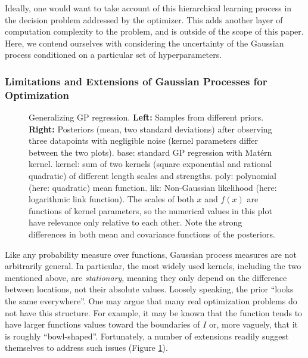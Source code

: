 \documentclass[twoside,11pt]{article}
\newcommand{\inputTikZ}[1]{%
 }
\newcommand{\inputTikZ}[1]{%
   \beginpgfgraphicnamed{#1-external}%
   \endpgfgraphicnamed%
 }
\begin{document}
Ideally, one would want to take account of this hierarchical learning
process in the decision problem addressed by the optimizer. This adds
another layer of computation complexity to the problem, and is outside
of the scope of this paper. Here, we contend ourselves with
considering the uncertainty of the Gaussian process conditioned on a
particular set of hyperparameters. 

\subsubsection{Limitations and Extensions of Gaussian Processes for
  Optimization}
\label{sec:limit-extens-gauss}

\begin{figure}
  \centering
  \inputTikZ{figures/priors} \hfill
  \inputTikZ{figures/posteriors}
  \caption{Generalizing GP regression. {\bfseries Left:} Samples from
    different priors. {\bfseries Right:} Posteriors (mean, two
    standard deviations) after observing three datapoints with
    negligible noise (kernel parameters differ between the two
    plots). {\sf base}: standard GP regression with Mat\'ern
    kernel. {\sf kernel}: sum of two kernels (square exponential and
    rational quadratic) of different length scales and strengths. {\sf
      poly}: polynomial (here: quadratic) mean function. {\sf lik}:
    Non-Gaussian likelihood (here: logarithmic link function). The
    scales of both $x$ and $f(x)$ are functions of kernel parameters,
    so the numerical values in this plot have relevance only relative
    to each other. Note the strong differences in both mean and
    covariance functions of the posteriors.}%
 \label{fig:kernel-extensions}
\end{figure}

Like any probability measure over functions, Gaussian process measures
are not arbitrarily general. In particular, the most widely used
kernels, including the two mentioned above, are \emph{stationary},
meaning they only depend on the difference between locations, not
their absolute values. Loosely speaking, the prior ``looks the same
everywhere''. One may argue that many real optimization problems do
not have this structure. For example, it may be known that the
function tends to have larger functions values toward the boundaries
of $I$ or, more vaguely, that it is roughly
``bowl-shaped''. Fortunately, a number of extensions readily suggest
themselves to address such issues (Figure
\ref{fig:kernel-extensions}).
\end{document}
